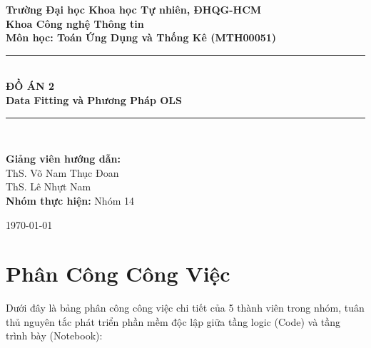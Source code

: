 \documentclass[12pt,a4paper]{article}
\begin{document}
\begin{titlepage}
    \centering
    \vspace*{1cm}
    
    {\large \textbf{Trường Đại học Khoa học Tự nhiên, ĐHQG-HCM}} \\[0.5cm]
    {\large \textbf{Khoa Công nghệ Thông tin}} \\[2cm]
    
    {\Large \textbf{Môn học: Toán Ứng Dụng và Thống Kê (MTH00051)}} \\[1.5cm]
    
    \rule{\textwidth}{1pt} \\[0.5cm]
    {\Huge \textbf{ĐỒ ÁN 2}} \\[0.5cm]
    {\Large \textbf{Data Fitting và Phương Pháp OLS}} \\[0.4cm]
    \rule{\textwidth}{1pt} \\[3cm]
    
    \begin{flushright}
        {\large 
        \textbf{Giảng viên hướng dẫn:} \\
        ThS. Võ Nam Thục Đoan \\
        ThS. Lê Nhựt Nam \\[0.5cm]
        \textbf{Nhóm thực hiện:} Nhóm 14
        }
    \end{flushright}
    
    \vfill
    
    {\large \today}
\end{titlepage}

\tableofcontents
\newpage

\section*{Phân Công Công Việc}

Dưới đây là bảng phân công công việc chi tiết của 5 thành viên trong nhóm, tuân thủ nguyên tắc phát triển phần mềm độc lập giữa tầng logic (Code) và tầng trình bày (Notebook):
\end{document}
